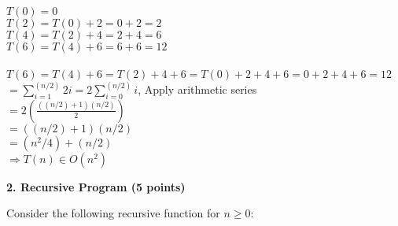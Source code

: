 \documentclass[12pt]{elsart}
\begin{document}
\begin{enumerate}
	$T(0)=0$\\
	$T(2)=T(0)+2 = 0+2=2$\\
	$T(4)=T(2)+4=2+4=6$\\
	$T(6)=T(4)+6=6+6=12$\\\\
	$T(6)=T(4)+6=T(2)+4+6=T(0)+2+4+6=0+2+4+6=12$\\
	$=\sum\limits_{i=1}^{ (n/2) } 2i = 2\sum\limits_{i=0}^{ (n/2) }i$, Apply arithmetic series\\
	$=2(\frac{((n/2)+1)(n/2)}{2})$\\
	$=((n/2)+1)(n/2)$\\
	$=(n^2/4)+(n/2)$\\
	$\Rightarrow \boxed{T(n) \in O(n^2)}$\\
\end{enumerate}

{\bf 2. Recursive Program (5 points)}

Consider the following recursive function for $n \geq 0$:
\end{document}
